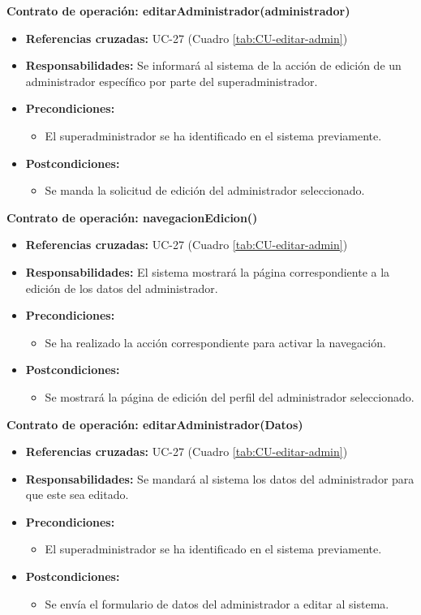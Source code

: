 \textbf{Contrato de operación: editarAdministrador(administrador)}
\begin{itemize}
\item \textbf{Referencias cruzadas:} UC-27 (Cuadro \ref{tab:CU-editar-admin})
\item \textbf{Responsabilidades:} Se informará al sistema de la acción de edición de un administrador específico por parte del superadministrador.
\item \textbf{Precondiciones:} 
 \begin{itemize}
\item El superadministrador se ha identificado en el sistema previamente.
\end {itemize}
\item \textbf{Postcondiciones:} 
 \begin{itemize}
\item Se manda la solicitud de edición del administrador seleccionado.
\end {itemize}
\end {itemize}

\textbf{Contrato de operación: navegacionEdicion()}
\begin{itemize}
\item \textbf{Referencias cruzadas:} UC-27 (Cuadro \ref{tab:CU-editar-admin})
\item \textbf{Responsabilidades:} El sistema mostrará la página correspondiente a la edición de los datos del administrador.
\item \textbf{Precondiciones:} 
 \begin{itemize}
\item Se ha realizado la acción correspondiente para activar la navegación.
\end {itemize}
\item \textbf{Postcondiciones:} 
 \begin{itemize}
\item Se mostrará la página de edición del perfil del administrador seleccionado.
\end {itemize}
\end {itemize}

\textbf{Contrato de operación: editarAdministrador(Datos)}
\begin{itemize}
\item \textbf{Referencias cruzadas:} UC-27 (Cuadro \ref{tab:CU-editar-admin})
\item \textbf{Responsabilidades:} Se mandará al sistema los datos del administrador para que este sea editado.
\item \textbf{Precondiciones:} 
 \begin{itemize}
\item El superadministrador se ha identificado en el sistema previamente.
\end {itemize}
\item \textbf{Postcondiciones:} 
 \begin{itemize}
\item Se envía el formulario de datos del administrador a editar al sistema.
\end {itemize}
\end {itemize}


